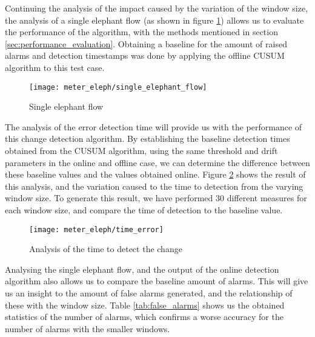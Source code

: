 \par Continuing the analysis of the impact caused by the variation of the window size, the analysis of a single elephant flow (as shown in figure 
\ref{fig:single_elephant}) allows us to evaluate the performance of the algorithm, with the methods mentioned in section \ref{sec:performance_evaluation}. Obtaining
a baseline for the amount of raised alarms and detection timestamps was done by applying the offline CUSUM algorithm to this test case.

\begin{figure}[H]
    \centering
    \texttt{[image: meter\_eleph/single\_elephant\_flow]}
    \caption{Single elephant flow}
    \label{fig:single_elephant}
\end{figure} 

\par The analysis of the error detection time will provide us with the performance of this change detection algorithm. By establishing the baseline detection times
obtained from the CUSUM algorithm, using the same threshold and drift parameters in the online and offline case, we can determine the difference between these
baseline values and the values obtained online. Figure \ref{fig:time_error} shows the result of this analysis, and the variation caused to the time to detection
from the varying window size. To generate this result, we have performed 30 different measures for each window size, and compare the time of detection to the baseline
value. 

\begin{figure}[H]
    \centering
    \texttt{[image: meter\_eleph/time\_error]}
    \caption{Analysis of the time to detect the change}
    \label{fig:time_error}
\end{figure} 

\par Analysing the single elephant flow, and the output of the online detection algorithm also allows us to compare the baseline amount of alarms. This will give 
us an insight to the amount of false alarms generated, and the relationship of these with the window size. Table \ref{tab:false_alarms} shows us the obtained
statistics of the number of alarms, which confirms a worse accuracy for the number of alarms with the smaller windows.

